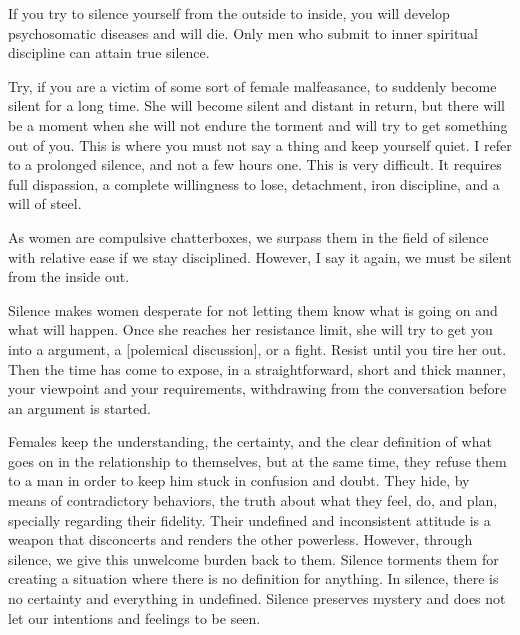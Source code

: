 \par If you try to silence yourself from the outside to inside, you will develop psychosomatic diseases and will die. Only men who submit to inner spiritual discipline can attain true silence.

\par Try, if you are a victim of some sort of female malfeasance, to suddenly become silent for a long time. She will become silent and distant in return, but there will be a moment when she will not endure the torment and will try to get something out of you. This is where you must not say a thing and keep yourself quiet. I refer to a prolonged silence, and not a few hours one. This is very difficult. It requires full dispassion, a complete willingness to lose, detachment, iron discipline, and a will of steel.

\par As women are compulsive chatterboxes, we surpass them in the field of silence with relative ease if we stay disciplined. However, I say it again, we must be silent from the inside out.

\par Silence makes women desperate for not letting them know what is going on and what will happen. Once she reaches her resistance limit, she will try to get you into a argument, a [polemical discussion], or a fight\footnotemark[20]. Resist until you tire her out. Then the time has come to expose, in a straightforward, short and thick manner, your viewpoint and your requirements, withdrawing from the conversation before an argument is started.


\par Females keep the understanding, the certainty, and the clear definition of what goes on in the relationship to themselves, but at the same time, they refuse them to a man in order to keep him stuck in confusion and doubt. They hide, by means of contradictory behaviors, the truth about what they feel, do, and plan, specially regarding their fidelity. Their undefined and inconsistent attitude is a weapon that disconcerts and renders the other powerless. However, through silence, we give this unwelcome burden back to them. Silence torments them for creating a situation where there is no definition for anything. In silence, there is no certainty and everything in undefined. Silence preserves mystery and does not let our intentions and feelings to be seen.


